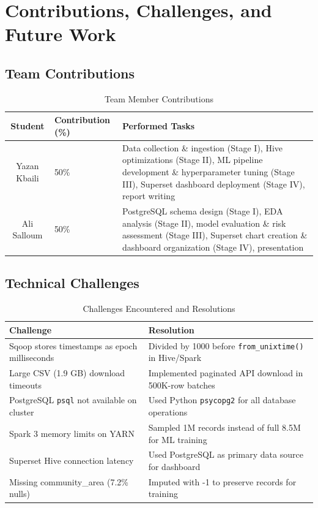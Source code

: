 \section{Contributions, Challenges, and Future Work}
\label{sec:contributions}

\subsection{Team Contributions}

\begin{table}[H]
\centering
\caption{Team Member Contributions}
\label{tab:contributions}
\begin{tabularx}{\textwidth}{cXX}
\toprule
\textbf{Student} & \textbf{Contribution (\%)} & \textbf{Performed Tasks} \\
\midrule
Yazan Kbaili & 50\% & Data collection \& ingestion (Stage I), Hive optimizations (Stage II), ML pipeline development \& hyperparameter tuning (Stage III), Superset dashboard deployment (Stage IV), report writing \\
Ali Salloum & 50\% & PostgreSQL schema design (Stage I), EDA analysis (Stage II), model evaluation \& risk assessment (Stage III), Superset chart creation \& dashboard organization (Stage IV), presentation \\
\bottomrule
\end{tabularx}
\end{table}

\subsection{Technical Challenges}

\begin{table}[H]
\centering
\caption{Challenges Encountered and Resolutions}
\label{tab:challenges}
\begin{tabularx}{\textwidth}{lX}
\toprule
\textbf{Challenge} & \textbf{Resolution} \\
\midrule
Sqoop stores timestamps as epoch milliseconds & Divided by 1000 before \texttt{from\_unixtime()} in Hive/Spark \\
Large CSV (1.9 GB) download timeouts & Implemented paginated API download in 500K-row batches \\
PostgreSQL \texttt{psql} not available on cluster & Used Python \texttt{psycopg2} for all database operations \\
Spark 3 memory limits on YARN & Sampled 1M records instead of full 8.5M for ML training \\
Superset Hive connection latency & Used PostgreSQL as primary data source for dashboard \\
Missing community\_area (7.2\% nulls) & Imputed with -1 to preserve records for training \\
\bottomrule
\end{tabularx}
\end{table}

